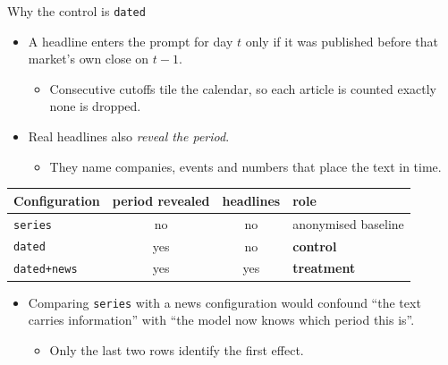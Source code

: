 \documentclass[9pt, aspectratio=169, t]{beamer}
\begin{document}
\begin{frame}{Why the control is \texttt{dated}}
  \begin{itemize}
    \item A headline enters the prompt for day $t$ only if it was published before that
          market's own close on $t-1$.
      \begin{itemize}
        \item Consecutive cutoffs tile the calendar, so each article is counted exactly
              none is dropped.
      \end{itemize}
    \item Real headlines also \emph{reveal the period}.
      \begin{itemize}
        \item They name companies, events and numbers that place the text in time.
      \end{itemize}
  \end{itemize}
  \vspace{0.3em}
  \centering
  \begin{tabular}{lccl}
    \toprule
    Configuration & period revealed & headlines & role \\
    \midrule
    \texttt{series}       & no  & no  & anonymised baseline \\
    \texttt{dated}        & yes & no  & \textbf{control} \\
    \texttt{dated+news}   & yes & yes & \textbf{treatment} \\
    \bottomrule
  \end{tabular}
  \vspace{0.7em}
  \begin{block}{}
    \begin{itemize}
      \item Comparing \texttt{series} with a news configuration would confound ``the
            text carries information'' with ``the model now knows which period this
            is''.
        \begin{itemize}
          \item Only the last two rows identify the first effect.
        \end{itemize}
    \end{itemize}
  \end{block}
\end{frame}
\end{document}
